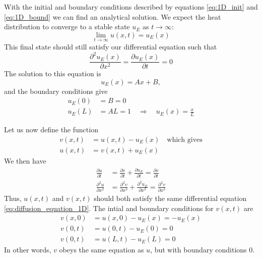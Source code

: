 \documentclass[reprint, english,notitlepage,nofootinbib]{revtex4-1}  %
\newcommand{\ddpart}[2]{\frac{\partial #1}{\partial #2}}
\newcommand{\ddpartsq}[2]{\frac{\partial^2 #1}{\partial #2^2}}
\begin{document}
With the initial and boundary conditions described by equations \eqref{eq:1D_init} and \eqref{eq:1D_bound} we can find an analytical solution. We expect the heat distribution to converge to a stable state $u_E$ as $t \to \infty$:
\begin{equation*}
\lim_{t \to \infty} u(x, t) = u_E(x)
\end{equation*}
This final state should still satisfy our differential equation such that
\begin{equation*}
\frac{\partial^2 u_E(x)}{\partial x^2} = \ddpart{u_E(x)}{t} = 0
\end{equation*}
The solution to this equation is
\begin{equation*}
u_E(x) = A x + B,
\end{equation*}
and the boundary conditions give
\begin{align*}
u_E(0) &= B = 0 \\
u_E(L) &= A L = 1 \quad \Rightarrow \quad u_E(x) = \frac{x}{L}
\end{align*}

Let us now define the function
\begin{align*}
v(x, t) &= u(x, t) - u_E(x) \quad \text{which gives} \\
u(x, t) &= v(x, t) + u_E(x)
\end{align*}
We then have
\begin{align*}
\ddpart{u}{t} &= \ddpart{v}{t} + \ddpart{u_E}{t} = \ddpart{v}{t} \\
\ddpartsq{u}{x} &= \ddpartsq{v}{x} + \ddpartsq{u_E}{x} = \ddpartsq{v}{x}
\end{align*}
Thus, $u(x, t)$ and $v(x, t)$ should both satisfy the same differential equation \eqref{eq:diffusion_equation_1D}. The intial and boundary conditions for $v(x, t)$ are
\begin{align*}
v(x, 0) &= u(x, 0) - u_E(x) = - u_E(x) \\
v(0, t) &= u(0, t) - u_E(0) = 0 \\
v(0, t) &= u(L, t) - u_E(L) = 0
\end{align*}
In other words, $v$ obeys the same equation as $u$, but with boundary conditions 0.
\end{document}
